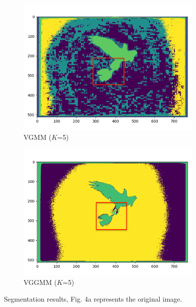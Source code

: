 \documentclass[conference]{IEEEtran}
\begin{document}
\begin{figure}
    \centering
    \begin{subfigure}{.5\linewidth}
        \centering
        \includegraphics[width=1\textwidth]{imgresults/eagle_vgm.png}
        \caption{VGMM ($K$=5)}
        \label{fig:sub1}
    \end{subfigure}%
    \begin{subfigure}{.5\linewidth}
        \centering
        \includegraphics[width=1\textwidth]{imgresults/eagle_vggm.png}
        \caption{VGGMM ($K$=5)}
        \label{fig:sub2}
    \end{subfigure}
    \caption{Segmentation results, Fig. 4a represents the original image.}
    \label{fig:eagle}
\end{figure}
\end{document}
